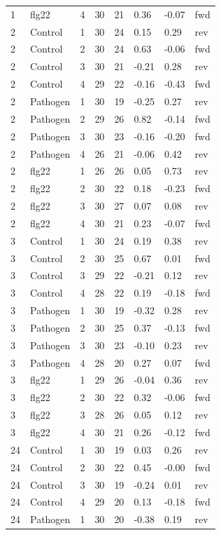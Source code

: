 \begin{table}[ht]
\begin{tabular}{llllllll}
1 & flg22 & 4 & 30 & 21 & 0.36 & -0.07 & fwd \\
2 & Control & 1 & 30 & 24 & 0.15 & 0.29 & rev \\
2 & Control & 2 & 30 & 24 & 0.63 & -0.06 & fwd \\
2 & Control & 3 & 30 & 21 & -0.21 & 0.28 & rev \\
2 & Control & 4 & 29 & 22 & -0.16 & -0.43 & fwd \\
2 & Pathogen & 1 & 30 & 19 & -0.25 & 0.27 & rev \\
2 & Pathogen & 2 & 29 & 26 & 0.82 & -0.14 & fwd \\
2 & Pathogen & 3 & 30 & 23 & -0.16 & -0.20 & fwd \\
2 & Pathogen & 4 & 26 & 21 & -0.06 & 0.42 & rev \\
2 & flg22 & 1 & 26 & 26 & 0.05 & 0.73 & rev \\
2 & flg22 & 2 & 30 & 22 & 0.18 & -0.23 & fwd \\
2 & flg22 & 3 & 30 & 27 & 0.07 & 0.08 & rev \\
2 & flg22 & 4 & 30 & 21 & 0.23 & -0.07 & fwd \\
3 & Control & 1 & 30 & 24 & 0.19 & 0.38 & rev \\
3 & Control & 2 & 30 & 25 & 0.67 & 0.01 & fwd \\
3 & Control & 3 & 29 & 22 & -0.21 & 0.12 & rev \\
3 & Control & 4 & 28 & 22 & 0.19 & -0.18 & fwd \\
3 & Pathogen & 1 & 30 & 19 & -0.32 & 0.28 & rev \\
3 & Pathogen & 2 & 30 & 25 & 0.37 & -0.13 & fwd \\
3 & Pathogen & 3 & 30 & 23 & -0.10 & 0.23 & rev \\
3 & Pathogen & 4 & 28 & 20 & 0.27 & 0.07 & fwd \\
3 & flg22 & 1 & 29 & 26 & -0.04 & 0.36 & rev \\
3 & flg22 & 2 & 30 & 22 & 0.32 & -0.06 & fwd \\
3 & flg22 & 3 & 28 & 26 & 0.05 & 0.12 & rev \\
3 & flg22 & 4 & 30 & 21 & 0.26 & -0.12 & fwd \\
24 & Control & 1 & 30 & 19 & 0.03 & 0.26 & rev \\
24 & Control & 2 & 30 & 22 & 0.45 & -0.00 & fwd \\
24 & Control & 3 & 30 & 19 & -0.24 & 0.01 & rev \\
24 & Control & 4 & 29 & 20 & 0.13 & -0.18 & fwd \\
24 & Pathogen & 1 & 30 & 20 & -0.38 & 0.19 & rev \\

\end{tabular}
\end{table}
